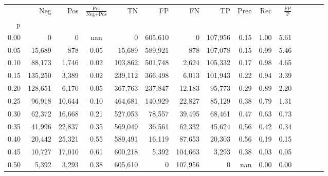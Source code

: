 \begin{tabular}{rrrcrrrrrrrrrrr}
\toprule
{} &      Neg &     Pos & $\frac{\text{Pos}}{\text{Neg}+\text{Pos}}$ &       TN &       FP &       FN &       TP &  Prec &   Rec & $\frac{\text{FP}}{\text{P}}$ \\
p    &          &         &                                            &          &          &          &          &       &       &                              \\
\midrule
0.00 &        0 &       0 &                                        nan &        0 &  605,610 &        0 &  107,956 &  0.15 &  1.00 &                         5.61 \\
0.05 &   15,689 &     878 &                                       0.05 &   15,689 &  589,921 &      878 &  107,078 &  0.15 &  0.99 &                         5.46 \\
0.10 &   88,173 &   1,746 &                                       0.02 &  103,862 &  501,748 &    2,624 &  105,332 &  0.17 &  0.98 &                         4.65 \\
0.15 &  135,250 &   3,389 &                                       0.02 &  239,112 &  366,498 &    6,013 &  101,943 &  0.22 &  0.94 &                         3.39 \\
0.20 &  128,651 &   6,170 &                                       0.05 &  367,763 &  237,847 &   12,183 &   95,773 &  0.29 &  0.89 &                         2.20 \\
0.25 &   96,918 &  10,644 &                                       0.10 &  464,681 &  140,929 &   22,827 &   85,129 &  0.38 &  0.79 &                         1.31 \\
0.30 &   62,372 &  16,668 &                                       0.21 &  527,053 &   78,557 &   39,495 &   68,461 &  0.47 &  0.63 &                         0.73 \\
0.35 &   41,996 &  22,837 &                                       0.35 &  569,049 &   36,561 &   62,332 &   45,624 &  0.56 &  0.42 &                         0.34 \\
0.40 &   20,442 &  25,321 &                                       0.55 &  589,491 &   16,119 &   87,653 &   20,303 &  0.56 &  0.19 &                         0.15 \\
0.45 &   10,727 &  17,010 &                                       0.61 &  600,218 &    5,392 &  104,663 &    3,293 &  0.38 &  0.03 &                         0.05 \\
0.50 &    5,392 &   3,293 &                                       0.38 &  605,610 &        0 &  107,956 &        0 &   nan &  0.00 &                         0.00 \\

\end{tabular}
